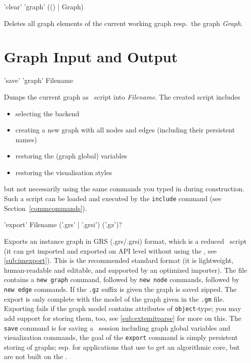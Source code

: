 \begin{rail}
  'clear' 'graph' (() | Graph)
\end{rail}
Deletes all graph elements of the current working graph resp.\ the graph \emph{Graph}.


\section{Graph Input and Output}
\label{outputcmds}

\begin{rail}
  'save' 'graph' Filename
\end{rail}
Dumps the current graph as \GrShell\ script into \emph{Filename}.
The created script includes
\begin{itemize}
  \item selecting the backend
  \item creating a new graph with all nodes and edges (including their persistent names)
  \item restoring the (graph global) variables
  \item restoring the visualisation styles
\end{itemize}
but not necessarily using the same commands you typed in during construction.
Such a script can be loaded and executed by the \texttt{include} command (see Section~\ref{commcommands}).

\begin{rail}
  'export' Filename ('.grs' | '.grsi') ('.gz')?
\end{rail}
Exports an instance graph in GRS (.grs/.grsi) format, which is a reduced \GrShell\ script
(it can get imported and exported on API level without using the \GrShell, see \ref{sub:imexport}).
This is the recommended standard format (it is lightweight, human-readable and editable, and supported by an optimized importer).
The file contains a \texttt{new graph} command, followed by \texttt{new node} commands, followed by \texttt{new edge} commands.
If the \texttt{.gz} suffix is given the graph is saved zipped.
The export is only complete with the model of the graph given in the \texttt{.gm} file.
Exporting fails if the graph model contains attributes of \texttt{object}-type; you may add support for storing them, too, see \ref{sub:extemitparse} for more on this.
The \texttt{save} command is for saving a \GrShell\ session including graph global variables and visualization commands,
the goal of the \texttt{export} command is simply persistent storing of graphs;
esp. for applications that use \GrG{ }to get an algorithmic core, but are not built on the \GrShell.

